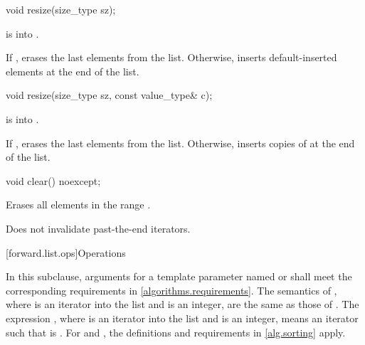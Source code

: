 %
\begin{itemdecl}
void resize(size_type sz);
\end{itemdecl}

\begin{itemdescr}
\pnum
\expects
{} is  into .

\pnum
\effects
If , erases the last  elements from the list. Otherwise, inserts  default-inserted
elements at the end of the list.
\end{itemdescr}

\begin{itemdecl}
void resize(size_type sz, const value_type& c);
\end{itemdecl}

\begin{itemdescr}
\pnum
\expects
{} is  into .

\pnum
\effects
If , erases the last  elements from the list. Otherwise, inserts 
copies of  at the end of the list.
\end{itemdescr}


%
\begin{itemdecl}
void clear() noexcept;
\end{itemdecl}

\begin{itemdescr}
\pnum
\effects
Erases all elements in the range .

\pnum
\remarks
Does not invalidate past-the-end iterators.
\end{itemdescr}

[forward.list.ops]{Operations}

\pnum
In this subclause,
arguments for a template parameter
named  or 
shall meet the corresponding requirements in \ref{algorithms.requirements}.
The semantics of ,
where  is an iterator into the list and  is an integer,
are the same as those of .
The expression ,
where  is an iterator into the list and  is an integer,
means an iterator  such that  is .
For  and ,
the definitions and requirements in \ref{alg.sorting} apply.

